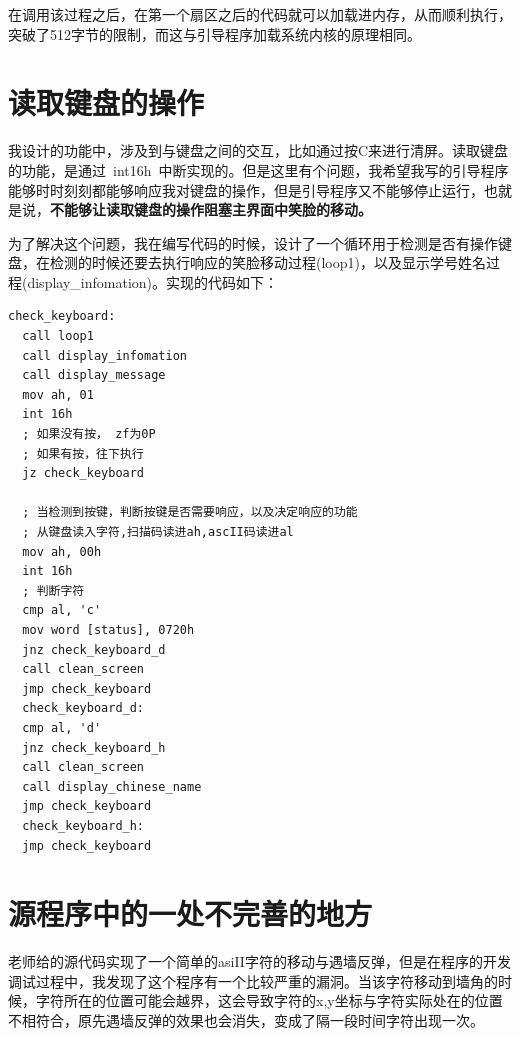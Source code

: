 \documentclass[forprint]{WHUBachelor}
\begin{document}
在调用该过程之后，在第一个扇区之后的代码就可以加载进内存，从而顺利执行，突破了512字节的限制，而这与引导程序加载系统内核的原理相同。

\section{读取键盘的操作}

我设计的功能中，涉及到与键盘之间的交互，比如通过按C来进行清屏。读取键盘的功能，是通过~int16h~中断实现的。但是这里有个问题，我希望我写的引导程序能够时时刻刻都能够响应我对键盘的操作，但是引导程序又不能够停止运行，也就是说，\textbf{不能够让读取键盘的操作阻塞主界面中笑脸的移动。} 

为了解决这个问题，我在编写代码的时候，设计了一个循环用于检测是否有操作键盘，在检测的时候还要去执行响应的笑脸移动过程(loop1)，以及显示学号姓名过程(display\_infomation)。实现的代码如下：

\begin{lstlisting}[language={[x86masm]Assembler}] 
check_keyboard:
  call loop1
  call display_infomation
  call display_message
  mov ah, 01
  int 16h
  ; 如果没有按， zf为0P
  ; 如果有按，往下执行
  jz check_keyboard

  ; 当检测到按键，判断按键是否需要响应，以及决定响应的功能
  ; 从键盘读入字符,扫描码读进ah,ascII码读进al
  mov ah, 00h
  int 16h
  ; 判断字符
  cmp al, 'c'
  mov word [status], 0720h
  jnz check_keyboard_d 
  call clean_screen
  jmp check_keyboard
  check_keyboard_d:
  cmp al, 'd'
  jnz check_keyboard_h
  call clean_screen
  call display_chinese_name
  jmp check_keyboard
  check_keyboard_h:
  jmp check_keyboard
\end{lstlisting}
 
\section{源程序中的一处不完善的地方}

老师给的源代码实现了一个简单的asiII字符的移动与遇墙反弹，但是在程序的开发调试过程中，我发现了这个程序有一个比较严重的漏洞。当该字符移动到墙角的时候，字符所在的位置可能会越界，这会导致字符的x,y坐标与字符实际处在的位置不相符合，原先遇墙反弹的效果也会消失，变成了隔一段时间字符出现一次。







\end{document}
